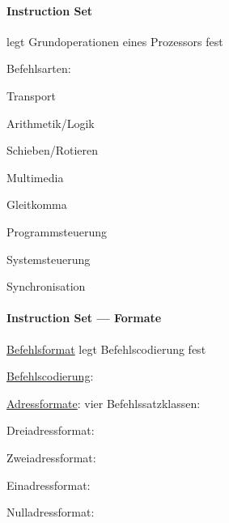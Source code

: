 \paragraph{Instruction Set}
\begin{items}
	\item legt Grundoperationen eines Prozessors fest
	\item Befehlsarten:
	\begin{enumeration}
		\item Transport
		\item Arithmetik/Logik
		\item Schieben/Rotieren
		\item Multimedia
		\item Gleitkomma
		\item Programmsteuerung
		\item Systemsteuerung
		\item Synchronisation
	\end{enumeration}
\end{items}

\paragraph{Instruction Set --- Formate}
\begin{items}
	\item \underline{Befehlsformat} legt Befehlscodierung fest
	\item \underline{Befehlscodierung}: 
	\item \underline{Adressformate}: vier Befehlssatzklassen:
	\begin{enumeration}
		\item Dreiadressformat: \code{[opcode] [dest] [src1] [src2]}
		\item Zweiadressformat: 
		\item Einadressformat: \code{[opcode] [src]}
		\item Nulladressformat: \code{[opcode]}
	\end{enumeration}
\end{items}

